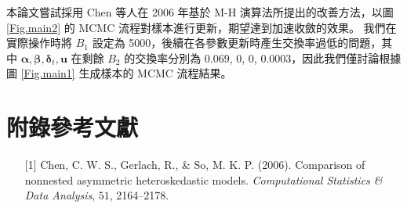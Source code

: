 \documentclass[12pt,a4paper]{article}
\begin{document}
\begin{CJK}{UTF8}{bkai}
本論文嘗試採用 Chen 等人在 2006 年基於 M-H 演算法所提出的改善方法，以圖 \ref{Fig.main2} 的 MCMC 流程對樣本進行更新，期望達到加速收斂的效果。
我們在實際操作時將 $B_1$ 設定為 5000，後續在各參數更新時產生交換率過低的問題，其中 $\bm{\alpha}, \bm{\beta}, \bm{\delta}_t, \bm{u}$ 在剩餘 $B_2$ 的交換率分別為 0.069, 0, 0, 0.0003，因此我們僅討論根據圖 \ref{Fig.main1} 生成樣本的 MCMC 流程結果。
\newpage
\section*{附錄參考文獻}
\begin{enumerate}
\item[{[1]}] Chen, C. W. S., Gerlach, R., \& So, M. K. P. (2006). Comparison of nonnested asymmetric heteroskedastic models. \emph{Computational Statistics \& Data Analysis}, $\mathit{51}$, 2164–2178.
\end{enumerate}

\end{CJK}
\end{document}
